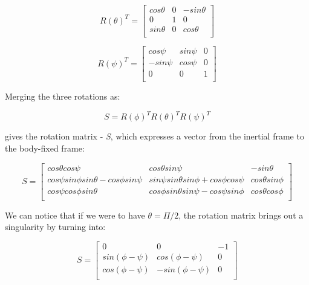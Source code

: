  \begin{equation}
\label{pitchrotation}	
 	R(\theta)^{T}=\begin{bmatrix}
 	cos\theta & 0 & -sin\theta \\
 	0 & 1 & 0 \\
 	sin\theta & 0 & cos\theta \\
 	\end{bmatrix}
 \end{equation}
 
 \begin{equation}
\label{yawrotation}	
 	R(\psi)^{T}=\begin{bmatrix}
 	cos\psi & sin\psi & 0 \\
 	-sin\psi & cos\psi & 0 \\
 	0 & 0 & 1 \\
 	\end{bmatrix}
 \end{equation}
 
Merging the three rotations as: 

\begin{equation}
\label{S1}	
 	S=R(\phi)^{T}R(\theta)^{T}R(\psi)^{T}
\end{equation}
 
gives the rotation matrix - \textit{S}, which expresses a vector from the inertial frame to the body-fixed frame: 
 
\begin{equation}
\label{S2}
 S=\begin{bmatrix}
 	cos\theta cos\psi & cos\theta sin\psi & -sin\theta \\
 	cos\psi sin\phi sin\theta-cos\phi sin\psi & sin\psi sin\theta sin\phi+cos\phi cos\psi & cos\theta sin\phi \\
 	cos\psi cos\phi sin\theta & cos\phi sin\theta sin\psi-cos\psi sin\phi & cos\theta cos\phi \\
\end{bmatrix}
\end{equation}
 	 
We can notice that if we were to have $\theta=\Pi/2$, the rotation matrix brings out a singularity by turning into:

\begin{equation}
\label{S3}
 S=\begin{bmatrix}
 	0 & 0 & -1 \\
 	sin(\phi-\psi) & cos(\phi-\psi) & 0 \\
 	cos(\phi-\psi) & -sin(\phi-\psi) & 0 \\
\end{bmatrix}
\end{equation}
 	 
